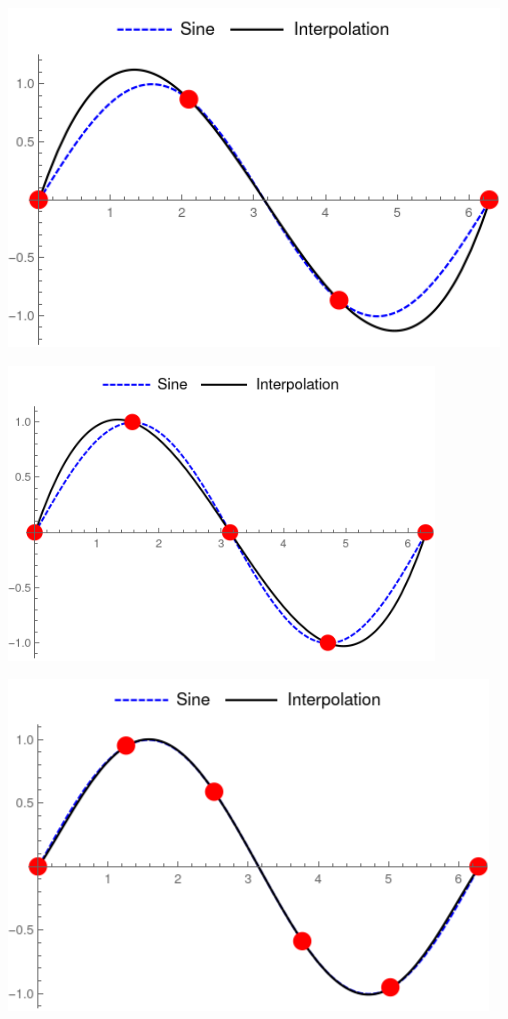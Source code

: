 \documentclass[12pt]{article}
\newenvironment{Figure}
  {\par\medskip\noindent\minipage{\linewidth}}
  {\endminipage\par\medskip}
\begin{document}
\begin{multicols*}{2}
    \begin{Figure}
        \includegraphics[width=\linewidth]{Images/SineInterpolation_EvenlySpaced/sin_interpolation_4.png}
    \end{Figure}
    \begin{Figure}
        \includegraphics[width=\linewidth]{Images/SineInterpolation_EvenlySpaced/sin_interpolation_5.png}
    \end{Figure}
    \begin{Figure}
        \includegraphics[width=\linewidth]{Images/SineInterpolation_EvenlySpaced/sin_interpolation_6.png}

\end{Figure}
\end{multicols*}
\end{document}
